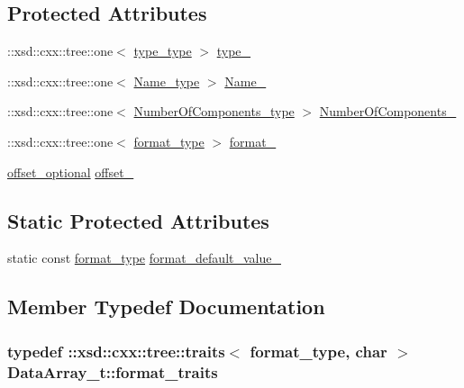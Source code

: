 \subsection*{Protected Attributes}
\begin{DoxyCompactItemize}
\item 
\+::xsd\+::cxx\+::tree\+::one$<$ \hyperlink{classDataArray__t_a484a0509e4f141d9970d75881703a51e}{type\+\_\+type} $>$ \hyperlink{classDataArray__t_a213841b0371a05383d0de7b8cf35c571}{type\+\_\+}
\item 
\+::xsd\+::cxx\+::tree\+::one$<$ \hyperlink{classDataArray__t_afc6836923916c2489f91caea78ec4ad6}{Name\+\_\+type} $>$ \hyperlink{classDataArray__t_a75c5be79f9202ea631b90bc7ab6572ac}{Name\+\_\+}
\item 
\+::xsd\+::cxx\+::tree\+::one$<$ \hyperlink{classDataArray__t_aac602cec132f6e771f7fa3be1d19c16f}{Number\+Of\+Components\+\_\+type} $>$ \hyperlink{classDataArray__t_ae0e1c29893204a5066b86ffe5101d176}{Number\+Of\+Components\+\_\+}
\item 
\+::xsd\+::cxx\+::tree\+::one$<$ \hyperlink{classDataArray__t_ae453ea653980baef2e3296005d70bfbd}{format\+\_\+type} $>$ \hyperlink{classDataArray__t_a96cef5bd78a9f11079aa5dfe94d7b540}{format\+\_\+}
\item 
\hyperlink{classDataArray__t_a4bc33060e7c386b658c752347ac5f03e}{offset\+\_\+optional} \hyperlink{classDataArray__t_a6479c8a02a37c84956afb645b247ef0e}{offset\+\_\+}
\end{DoxyCompactItemize}
\subsection*{Static Protected Attributes}
\begin{DoxyCompactItemize}
\item 
static const \hyperlink{classDataArray__t_ae453ea653980baef2e3296005d70bfbd}{format\+\_\+type} \hyperlink{classDataArray__t_ab96d3bb715c0ac4b96279a85eef117a8}{format\+\_\+default\+\_\+value\+\_\+}
\end{DoxyCompactItemize}


\subsection{Member Typedef Documentation}
\subsubsection[{\texorpdfstring{format\+\_\+traits}{format_traits}}]{\setlength{\rightskip}{0pt plus 5cm}typedef \+::xsd\+::cxx\+::tree\+::traits$<$ {\bf format\+\_\+type}, char $>$ {\bf Data\+Array\+\_\+t\+::format\+\_\+traits}}\hypertarget{classDataArray__t_a2a31ef3ce1dfa973843a02e17762e7a3}{}\label{classDataArray__t_a2a31ef3ce1dfa973843a02e17762e7a3}
